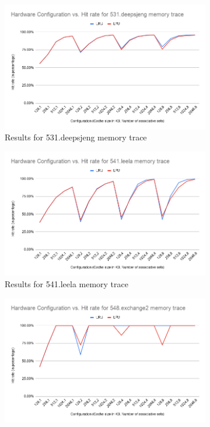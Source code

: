 \documentclass[letterpaper, 11pt]{article}
\begin{document}
	\begin{figure}[ht!]
		\centering
		\begin{subfigure}[b]{.48\linewidth}
			\includegraphics[width=\textwidth]{531_deepsjeng_results.png}
			\caption{Results for 531.deepsjeng memory trace}
			\label{fig2a}
		\end{subfigure}
		\begin{subfigure}[b]{.48\linewidth}
			\includegraphics[width=\textwidth]{541_leela_results.png}
			\caption{Results for 541.leela memory trace}
			\label{fig2b}
		\end{subfigure}
		\begin{subfigure}[b]{.48\linewidth}
			\includegraphics[width=\textwidth]{548_exchange2_results.png}

\end{subfigure}
\end{figure}
\end{document}
